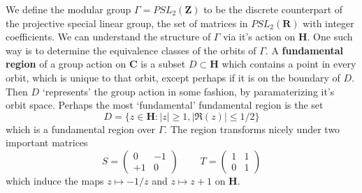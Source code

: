 We define the modular group $\Gamma = PSL_2(\mathbf{Z})$ to be the discrete counterpart of the projective special linear group, the set of matrices in $PSL_2(\mathbf{R})$ with integer coefficients. We can understand the structure of $\Gamma$ via it's action on $\mathbf{H}$. One such way is to determine the equivalence classes of the orbits of $\Gamma$. A {\bf fundamental region} of a group action on $\mathbf{C}$ is a subset $D \subset \mathbf{H}$ which contains a point in every orbit, which is unique to that orbit, except perhaps if it is on the boundary of $D$. Then $D$ `represents' the group action in some fashion, by paramaterizing it's orbit space. Perhaps the most `fundamental' fundamental region is the set
%
\[ D = \{ z \in \mathbf{H} : |z| \geq 1, |\Re(z)| \leq 1/2 \} \]
%
which is a fundamental region over $\Gamma$. The region transforms nicely under two important matrices
%
\[ S = \begin{pmatrix} 0 & -1 \\ +1 & 0 \end{pmatrix}\ \ \ \ \ \ \ \ \ \ T = \begin{pmatrix} 1 & 1 \\ 0 & 1 \end{pmatrix} \]
%
which induce the maps $z \mapsto -1/z$ and $z \mapsto z + 1$ on $\mathbf{H}$.

